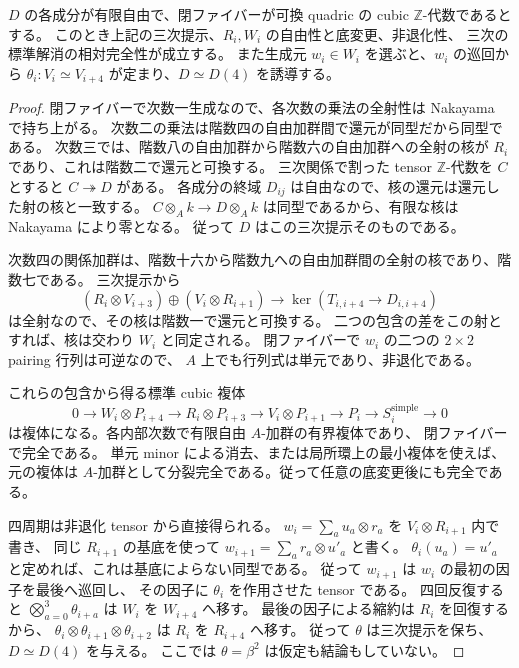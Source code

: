 \begin{lemma}
\label{lem:relative-cubic-tensors-artin}
$D$ の各成分が有限自由で、閉ファイバーが可換 quadric の cubic
$\mathbb Z$-代数であるとする。
このとき上記の三次提示、$R_i,W_i$ の自由性と底変更、非退化性、
三次の標準解消の相対完全性が成立する。
また生成元 $w_i\in W_i$ を選ぶと、$w_i$ の巡回から
$\theta_i:V_i\simeq V_{i+4}$ が定まり、$D\simeq D(4)$ を誘導する。
\end{lemma}
\begin{proof}
閉ファイバーで次数一生成なので、各次数の乗法の全射性は Nakayama で持ち上がる。
次数二の乗法は階数四の自由加群間で還元が同型だから同型である。
次数三では、階数八の自由加群から階数六の自由加群への全射の核が
$R_i$ であり、これは階数二で還元と可換する。
三次関係で割った tensor $\mathbb Z$-代数を $C$ とすると $C\twoheadrightarrow D$ がある。
各成分の終域 $D_{ij}$ は自由なので、核の還元は還元した射の核と一致する。
$C\otimes_Ak\to D\otimes_Ak$ は同型であるから、有限な核は Nakayama により零となる。
従って $D$ はこの三次提示そのものである。

次数四の関係加群は、階数十六から階数九への自由加群間の全射の核であり、階数七である。
三次提示から
\[
 (R_i\otimes V_{i+3})\oplus(V_i\otimes R_{i+1})
 \longrightarrow\ker(T_{i,i+4}\to D_{i,i+4})
\]
は全射なので、その核は階数一で還元と可換する。
二つの包含の差をこの射とすれば、核は交わり $W_i$ と同定される。
閉ファイバーで $w_i$ の二つの $2\times2$ pairing 行列は可逆なので、
$A$ 上でも行列式は単元であり、非退化である。

これらの包含から得る標準 cubic 複体
\[
 0\to W_i\otimes P_{i+4}\to R_i\otimes P_{i+3}
 \to V_i\otimes P_{i+1}\to P_i\to S_i^{\mathrm{simple}}\to0
\]
は複体になる。各内部次数で有限自由 $A$-加群の有界複体であり、
閉ファイバーで完全である。
単元 minor による消去、または局所環上の最小複体を使えば、
元の複体は $A$-加群として分裂完全である。従って任意の底変更後にも完全である。

四周期は非退化 tensor から直接得られる。
$w_i=\sum_a u_a\otimes r_a$ を $V_i\otimes R_{i+1}$ 内で書き、
同じ $R_{i+1}$ の基底を使って $w_{i+1}=\sum_a r_a\otimes u'_a$ と書く。
$\theta_i(u_a)=u'_a$ と定めれば、これは基底によらない同型である。
従って $w_{i+1}$ は $w_i$ の最初の因子を最後へ巡回し、
その因子に $\theta_i$ を作用させた tensor である。
四回反復すると $\bigotimes_{a=0}^3\theta_{i+a}$ は $W_i$ を $W_{i+4}$ へ移す。
最後の因子による縮約は $R_i$ を回復するから、
$\theta_i\otimes\theta_{i+1}\otimes\theta_{i+2}$ は $R_i$ を $R_{i+4}$ へ移す。
従って $\theta$ は三次提示を保ち、$D\simeq D(4)$ を与える。
ここでは $\theta=\beta^2$ は仮定も結論もしていない。
\end{proof}

